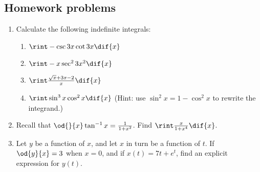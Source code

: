 \subsection{Homework problems}
\begin{enumerate}
  \item Calculate the following indefinite integrals:
    \begin{enumerate}
      \item $ \rint -\csc 3x \cot 3x \dif{x} $
      \item $ \rint -x\sec^2 3x^2 \dif{x} $
      \item $ \rint \frac{\sqrt{x} + 3x - 2}{x} \dif{x} $
      \item $ \rint \sin^3 x \cos^2 x \dif{x} $ (Hint: use $ \sin^2 x = 1 - \cos^2 x $ to rewrite the integrand.)
    \end{enumerate}
  \item Recall that $ \od{}{x} \tan^{-1} x = \frac{1}{1 + x^2} $. Find $ \rint \frac{x}{1 + x^4} \dif{x} $.
  \item Let $ y $ be a function of $ x $, and let $ x $ in turn be a function of $ t $. If $ \od{y}{x} = 3 $ when $ x = 0 $,
        and if $ x(t) = 7t + e^t $, find an explicit expression for $ y(t) $.
\end{enumerate}
